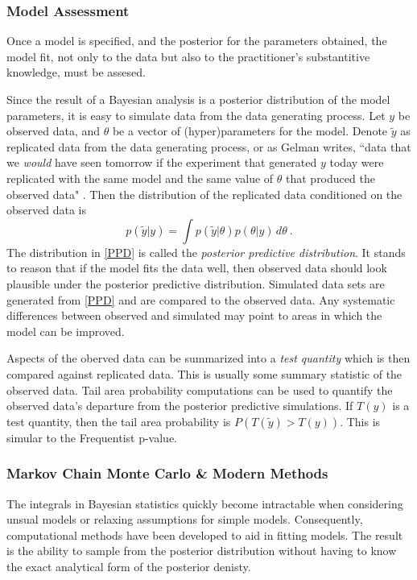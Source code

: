 \subsubsection{Model Assessment}

Once a model is specified, and the posterior for the parameters obtained, the model fit, not only to the data but also to the practitioner's substantitive knowledge, must be assesed.  

Since the result of a Bayesian analysis is a posterior distribution of the model parameters, it is easy to simulate data from the data generating process.  Let $ y $ be observed data, and $ \theta $ be a vector of (hyper)parameters for the model.  Denote $ \tilde{y} $ as replicated data from the data generating process, or as Gelman writes, ``data that we \textit{would} have seen tomorrow if the experiment that generated $ y $ today were replicated with the same model and the same value of $ \theta $ that produced the observed data" \cite[page~145]{gelman2013bayesian}.  Then the distribution of the replicated data conditioned on the observed data is 
%
\begin{equation}\label{PPD}
	p(\tilde{y} \vert y) = \int p(\tilde{y} \vert \theta) p(\theta \vert y) \, d\theta  \>.
\end{equation}
%
The distribution in \cref{PPD} is called the \textit{posterior predictive distribution}.  It stands to reason that if the model fits the data well, then observed data should look plausible under the posterior predictive distribution.  Simulated data sets are generated from \cref{PPD} and are compared to the observed data.  Any systematic differences between observed and simulated may point to areas in which the model can be improved.

Aspects of the oberved data can be summarized into a \textit{test quantity} which is then compared against replicated data. This is usually some summary statistic of the observed data. Tail area probability computations can be used to quantify  the observed data's departure from the posterior predictive simulations.  If $ T(y) $ is a test quantity, then the tail area probability is $ P(T(\tilde{y}) > T(y) ) $.  This is simular to the Frequentist p-value.


\subsubsection{Markov Chain Monte Carlo \& Modern Methods}

The integrals in Bayesian statistics quickly become intractable when considering unsual models or relaxing assumptions for simple models.  Consequently, computational methods have been developed to aid in fitting models.  The result is the ability to sample from the posterior distribution without having to know the exact analytical form of the posterior denisty.

